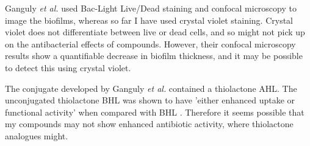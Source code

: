 Ganguly \textit{et al.} used Bac-Light Live/Dead staining and confocal microscopy to image the biofilms, whereas so far I have used crystal violet staining. Crystal violet does not differentiate between live or dead cells, and so might not pick up on the antibacterial effects of compounds. However, their confocal microscopy results show a quantifiable decrease in biofilm thickness, and it may be possible to detect this using crystal violet.

The conjugate  developed by Ganguly \textit{et al.} contained a thiolactone AHL. The unconjugated thiolactone BHL  was shown to have 'either enhanced uptake or functional activity' when compared with BHL . Therefore it seems possible that my compounds may not show enhanced antibiotic activity, where thiolactone analogues might.